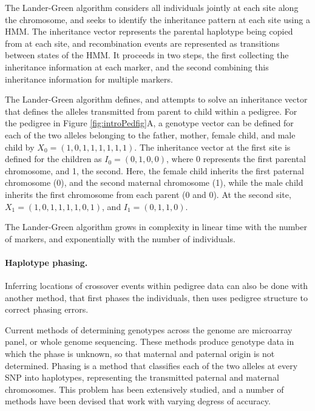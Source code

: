 The Lander-Green algorithm\cite{Lander1987} considers all individuals jointly at each site along the chromosome, and seeks to identify the inheritance pattern at each site using a HMM.
The inheritance vector represents the parental haplotype being copied from at each site, and recombination events are represented as transitions between states of the HMM.
It proceeds in two steps, the first collecting the inheritance information at each marker, and the second combining this inheritance information for multiple markers.

The Lander-Green algorithm defines, and attempts to solve an inheritance vector that defines the alleles transmitted from parent to child within a pedigree.
For the pedigree in Figure \ref{fig:introPedfig}A, a genotype vector can be defined for each of the two alleles belonging to the father, mother, female child, and male child by $X_0 = ( {1,0}, {1,1}, {1,1}, {1,1} )$.
The inheritance vector at the first site is defined for the children as $I_0 = ( {0,1}, {0,0} )$, where 0 represents the first parental chromosome, and 1, the second.
Here, the female child inherits the first paternal chromosome (0), and the second maternal chromosome (1), while the male child inherits the first chromosome from each parent (0 and 0).
At the second site, $X_1 = ( {1,0}, {1,1}, {1,1}, {0,1} )$, and $I_1 = ( {0,1}, {1,0} )$.





The Lander-Green algorithm grows in complexity in linear time with the number of markers, and exponentially with the number of individuals.


\paragraph{Haplotype phasing.}

Inferring locations of crossover events within pedigree data can also be done with another method, that first phases the individuals, then uses pedigree structure to correct phasing errors.

Current methods of determining genotypes across the genome are microarray panel, or whole genome sequencing.
These methods produce genotype data in which the phase is unknown, so that maternal and paternal origin is not determined.
Phasing is a method that classifies each of the two alleles at every SNP into haplotypes, representing the transmitted paternal and maternal chromosomes.
This problem has been extensively studied, and a number of methods have been devised that work with varying degress of accuracy.

